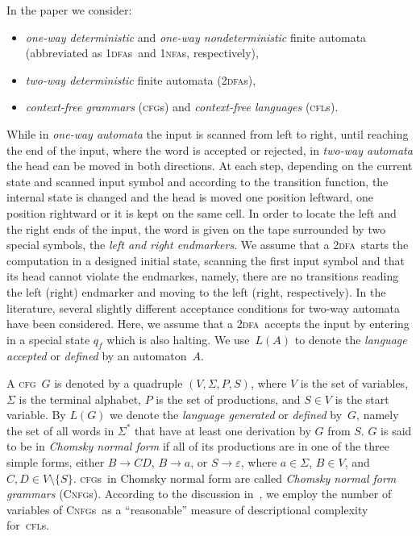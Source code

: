 \documentclass[11pt]{article}
\newcommand*{\tw}{\textsc{2}}
\newcommand*{\twdfa}{\tw\textsc{dfa}}
\newcommand*{\twdfas}{\tw\textsc{dfa}s}
\newcommand*{\ow}{\textsc{1}}
\newcommand*{\owdfas}{\ow\textsc{dfa}s}
\newcommand*{\ownfas}{\ow\textsc{nfa}s}
\newcommand*{\cfg}{\textsc{cfg}}
\newcommand*{\cfgs}{\textsc{cfg}s}
\newcommand*{\cnfgs}{\textsc{Cnfg}s}
\newcommand*{\cfls}{\textsc{cfl}s}
\begin{document}
In the paper we consider:
\begin{itemize}
\item \emph{one-way deterministic} and \emph{one-way nondeterministic} finite automata (abbreviated as \owdfas\ and \ownfas, respectively),
\item \emph{two-way deterministic} finite automata (\twdfas),
\item \emph{context-free grammars} (\cfgs) and \emph{context-free languages} (\cfls).
\end{itemize}
While in \emph{one-way automata} the input is scanned from left to right, 
until reaching the end of the input, where the word is accepted or rejected,
in \emph{two-way automata}\label{p:twdfa} the head can be moved in both directions.
At each step, depending on the current state and scanned input symbol and according to the transition function, the 
internal state is changed and 
the head is moved one position leftward, one position rightward or it is kept on the same
cell. In order to locate
the left and the right ends of the input, the word is given on the tape surrounded by two special symbols,
the \emph{left and right endmarkers}. We assume that a \twdfa\ starts the computation in a designed initial state,
scanning the first input symbol and that its head cannot violate the endmarkes, namely, there are no transitions
reading the left (right) endmarker and moving to the left (right, respectively).
In the literature, several slightly different acceptance conditions for two-way automata have been considered.
Here, we assume that a \twdfa\ accepts the input by entering in a special state $q_f$ which is also halting.
We use~$L(A)$ to denote the \emph{language accepted} or \emph{defined} by an automaton~$A$.

\smallskip

A \cfg\ $G$ is denoted by a quadruple $(V, \Sigma, P, S)$, where $V$ is the set of variables, 
$\Sigma$ is the terminal alphabet, $P$ is the set of productions, 
and $S \in V$ is the start variable. 
By $L(G)$ we denote the \emph{language generated} or \emph{defined} by~$G$, namely the set of all words in $\Sigma^*$ that have at least one derivation by $G$ {}from $S$.  
$G$ is said to be in \emph{Chomsky normal form} if all of its productions are in one of the three simple forms, 
either $B \to CD$, $B \to a$, or $S \to \varepsilon$, where $a \in \Sigma$, $B \in V$, and $C, D \in V \setminus \{S\}$. 
\cfgs\ in Chomsky normal form are called {\it Chomsky normal form grammars} (\cnfgs). 
According to the discussion in~\cite{Gruska1973}, we employ the number of variables of \cnfgs\ as a ``reasonable'' measure of descriptional complexity for~\cfls. 
\end{document}
